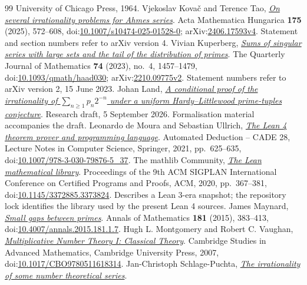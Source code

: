 \begin{thebibliography}{99}
  University of Chicago Press, 1964.
 Vjekoslav Kova\v{c} and Terence Tao, \href{https://arxiv.org/abs/2406.17593v4}{\emph{On several irrationality problems for Ahmes series}}.
  Acta Mathematica Hungarica \textbf{175} (2025), 572--608, doi:\href{https://doi.org/10.1007/s10474-025-01528-0}{10.1007/s10474-025-01528-0}; arXiv:\href{https://arxiv.org/abs/2406.17593v4}{2406.17593v4}. Statement and section numbers refer to arXiv version 4.
 Vivian Kuperberg, \href{https://arxiv.org/abs/2210.09775v2}{\emph{Sums of singular series with large sets and the tail of the distribution of primes}}.
  The Quarterly Journal of Mathematics \textbf{74} (2023), no.~4, 1457--1479, doi:\href{https://doi.org/10.1093/qmath/haad030}{10.1093/qmath/haad030}; arXiv:\href{https://arxiv.org/abs/2210.09775v2}{2210.09775v2}. Statement numbers refer to arXiv version 2, 15 June 2023.
 Johan Land, \href{https://github.com/beetree/math_erdos_251}{\emph{A conditional proof of the irrationality of $\sum_{n\ge1}p_n2^{-n}$ under a uniform Hardy--Littlewood prime-tuples conjecture}}.
  Research draft, 5 September 2026. Formalisation material accompanies the draft.
 Leonardo de Moura and Sebastian Ullrich, \href{https://doi.org/10.1007/978-3-030-79876-5_37}{\emph{The Lean 4 theorem prover and programming language}}.
  Automated Deduction -- CADE 28, Lecture Notes in Computer Science, Springer, 2021, pp.~625--635, doi:\href{https://doi.org/10.1007/978-3-030-79876-5_37}{10.1007/978-3-030-79876-5\_37}.
 {The mathlib Community}, \href{https://doi.org/10.1145/3372885.3373824}{\emph{The Lean mathematical library}}.
  Proceedings of the 9th ACM SIGPLAN International Conference on Certified Programs and Proofs, ACM, 2020, pp.~367--381, doi:\href{https://doi.org/10.1145/3372885.3373824}{10.1145/3372885.3373824}. Describes a Lean 3-era snapshot; the repository lock identifies the library used by the present Lean 4 sources.
 James Maynard, \href{https://doi.org/10.4007/annals.2015.181.1.7}{\emph{Small gaps between primes}}.
  Annals of Mathematics \textbf{181} (2015), 383--413, doi:\href{https://doi.org/10.4007/annals.2015.181.1.7}{10.4007/annals.2015.181.1.7}.
 Hugh L. Montgomery and Robert C. Vaughan, \href{https://doi.org/10.1017/CBO9780511618314}{\emph{Multiplicative Number Theory I: Classical Theory}}.
  Cambridge Studies in Advanced Mathematics, Cambridge University Press, 2007, doi:\href{https://doi.org/10.1017/CBO9780511618314}{10.1017/CBO9780511618314}.
 Jan-Christoph Schlage-Puchta, \href{https://arxiv.org/abs/1105.1451v1}{\emph{The irrationality of some number theoretical series}}.

\end{thebibliography}
